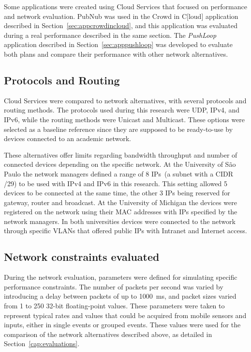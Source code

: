 Some applications were created using Cloud Services that focused on performance and network evaluation.
PubNub was used in the Crowd in C[loud] application described in Section~\ref{sec:appcrowdincloud}, and this application was evaluated during a real performance described in the same section.
The \textit{PushLoop} application described in Section~\ref{sec:apppushloop} was developed to evaluate both plans and compare their performance with other network alternatives.

\subsection*{Protocols and Routing}

Cloud Services were compared to network alternatives, with several protocols and routing methods.
The protocols used during this research were UDP, IPv4, and IPv6, while the routing methods were Unicast and Multicast.
These options were selected as a baseline reference since they are supposed to be ready-to-use by devices connected to an academic network.

These alternatives offer limits regarding bandwidth throughput and number of connected devices depending on the specific network.
At the University of São Paulo the network managers defined a range of 8 IPs~(a subnet with a CIDR /29) to be used with IPv4 and IPv6 in this research.
This setting allowed 5 devices to be connected at the same time, the other 3 IPs being reserved for gateway, router and broadcast.
At the University of Michigan the devices were registered on the network using their MAC addresses with IPs specified by the network managers.
In both universities devices were connected to the network through specific VLANs that offered public IPs with Intranet and Internet access.

\subsection*{Network constraints evaluated}

During the network evaluation, parameters were defined for simulating specific performance constraints.
The number of packets per second was varied by introducing a delay between packets of up to 1000~ms, and packet sizes varied from 1 to 250 32-bit floating-point values. These parameters were taken to represent typical rates and values that could be acquired from mobile sensors and inputs, either in single events or grouped events.
These values were used for the comparison of the network alternatives described above, as detailed in Section~\ref{cap:evaluations}.



